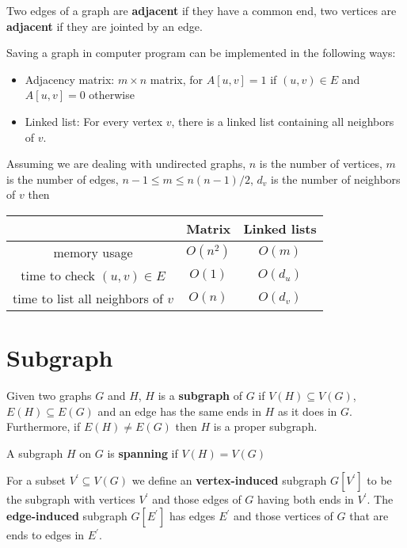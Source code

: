 				\begin{definition}[Adjacent]
					Two edges of a graph are \textbf{adjacent} if they have a common end, two vertices are \textbf{adjacent} if they are jointed by an edge.
				\end{definition}

				Saving a graph in computer program can be implemented in the following ways:
				\begin{itemize}
					\item Adjacency matrix: $m \times n$ matrix, for $A[u, v] = 1$ if $(u, v) \in E$ and $A[u, v] = 0$ otherwise
					\item Linked list: For every vertex $v$, there is a linked list containing all neighbors of $v$.
				\end{itemize}
				Assuming we are dealing with undirected graphs, $n$ is the number of vertices, $m$ is the number of edges, $n - 1 \le m \le n(n-1)/2$, $d_v$ is the number of neighbors of $v$ then
				\begin{table}[h]
					\centering
					\begin{tabular}{|c|c|c|}
						\hline
						 & Matrix & Linked lists\\
						\hline
						memory usage & $O(n^2)$ & $O(m)$\\
						\hline
						time to check $(u, v) \in E$ & $O(1)$ & $O(d_u)$\\
						\hline
						time to list all neighbors of $v$ & $O(n)$ & $O(d_v)$\\
						\hline
					\end{tabular}
				\end{table}

			\section{Subgraph}
				\begin{definition}[Subgraph]
					Given two graphs $G$ and $H$, $H$ is a \textbf{subgraph} of $G$ if $V(H)\subseteq V(G)$, $E(H)\subseteq E(G)$ and an edge has the same ends in $H$ as it does in $G$. Furthermore, if $E(H)\neq E(G)$ then $H$ is a proper subgraph.
				\end{definition}

				\begin{definition}[Spanning]
					A subgraph $H$ on $G$ is \textbf{spanning} if $V(H) = V(G)$
				\end{definition}

				\begin{definition}
					For a subset $V^\prime \subseteq V(G)$ we define an \textbf{vertex-induced} subgraph $G[V^\prime ]$ to be the subgraph with vertices $V^\prime$ and those edges of $G$ having both ends in $V^\prime$. The \textbf{edge-induced} subgraph $G[E^\prime ]$ has edges $E^\prime$ and those vertices of $G$ that are ends to edges in $E^\prime$.
				\end{definition}

